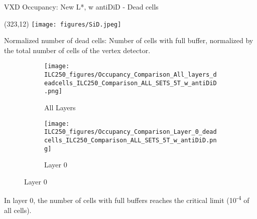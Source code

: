 \documentclass[xcolor={dvipsnames}]{beamer}
\newcommand{\sidlogo}{
  \setlength{\TPHorizModule}{1pt}
  \setlength{\TPVertModule}{1pt}
  \begin{textblock}{1}(323,12)
   \texttt{[image: figures/SiD.jpeg]}
  \end{textblock}
  }
\begin{document}
\begin{frame}{VXD Occupancy: New L*, w antiDiD - Dead cells}
\sidlogo
\alert{Normalized number of dead cells}: Number of cells with full buffer, normalized by the total number of cells of the vertex detector.
\begin{figure}
\centering
\begin{subfigure}[t]{0.48\textwidth}
\centering
\texttt{[image: ILC250\_figures/Occupancy\_Comparison\_All\_layers\_deadcells\_ILC250\_Comparison\_ALL\_SETS\_5T\_w\_antiDiD.png]}
\caption{\alert{All Layers}}
 \end{subfigure}
\hspace*{0.2cm}
\begin{subfigure}[t]{0.48\textwidth}
\centering
 \texttt{[image: ILC250\_figures/Occupancy\_Comparison\_Layer\_0\_deadcells\_ILC250\_Comparison\_ALL\_SETS\_5T\_w\_antiDiD.png]}
\caption{\alert{Layer 0}}
\end{subfigure}
\end{figure}
In layer 0, the number of cells with full buffers reaches the critical limit (10\textsuperscript{-4} of all cells).
\end{frame}
\setcounter{tocdepth}{3}
\end{document}
